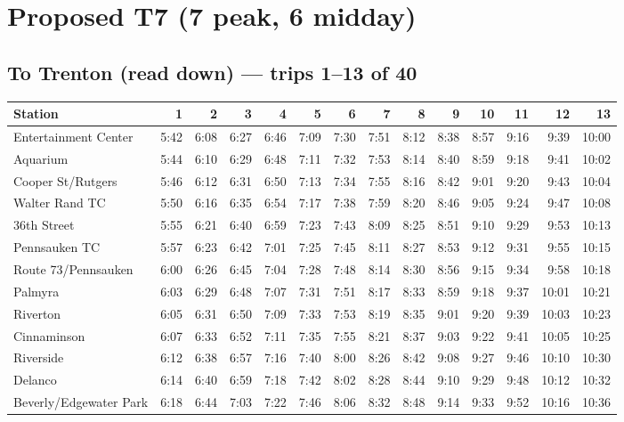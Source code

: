 \section{Proposed T7 (7 peak, 6 midday)}\label{tt:proposed_T7}
\subsection*{To Trenton (read down) --- trips 1--13 of 40}
\begin{center}\footnotesize\setlength{\tabcolsep}{3pt}\begin{tabular}{@{}lrrrrrrrrrrrrr@{}}\toprule
Station & 1 & 2 & 3 & 4 & 5 & 6 & 7 & 8 & 9 & 10 & 11 & 12 & 13 \\\midrule
Entertainment Center & 5:42 & 6:08 & 6:27 & 6:46 & 7:09 & 7:30 & 7:51 & 8:12 & 8:38 & 8:57 & 9:16 & 9:39 & 10:00 \\
Aquarium & 5:44 & 6:10 & 6:29 & 6:48 & 7:11 & 7:32 & 7:53 & 8:14 & 8:40 & 8:59 & 9:18 & 9:41 & 10:02 \\
Cooper St/Rutgers & 5:46 & 6:12 & 6:31 & 6:50 & 7:13 & 7:34 & 7:55 & 8:16 & 8:42 & 9:01 & 9:20 & 9:43 & 10:04 \\
Walter Rand TC & 5:50 & 6:16 & 6:35 & 6:54 & 7:17 & 7:38 & 7:59 & 8:20 & 8:46 & 9:05 & 9:24 & 9:47 & 10:08 \\
36th Street & 5:55 & 6:21 & 6:40 & 6:59 & 7:23 & 7:43 & 8:09 & 8:25 & 8:51 & 9:10 & 9:29 & 9:53 & 10:13 \\
Pennsauken TC & 5:57 & 6:23 & 6:42 & 7:01 & 7:25 & 7:45 & 8:11 & 8:27 & 8:53 & 9:12 & 9:31 & 9:55 & 10:15 \\
Route 73/Pennsauken & 6:00 & 6:26 & 6:45 & 7:04 & 7:28 & 7:48 & 8:14 & 8:30 & 8:56 & 9:15 & 9:34 & 9:58 & 10:18 \\
Palmyra & 6:03 & 6:29 & 6:48 & 7:07 & 7:31 & 7:51 & 8:17 & 8:33 & 8:59 & 9:18 & 9:37 & 10:01 & 10:21 \\
Riverton & 6:05 & 6:31 & 6:50 & 7:09 & 7:33 & 7:53 & 8:19 & 8:35 & 9:01 & 9:20 & 9:39 & 10:03 & 10:23 \\
Cinnaminson & 6:07 & 6:33 & 6:52 & 7:11 & 7:35 & 7:55 & 8:21 & 8:37 & 9:03 & 9:22 & 9:41 & 10:05 & 10:25 \\
Riverside & 6:12 & 6:38 & 6:57 & 7:16 & 7:40 & 8:00 & 8:26 & 8:42 & 9:08 & 9:27 & 9:46 & 10:10 & 10:30 \\
Delanco & 6:14 & 6:40 & 6:59 & 7:18 & 7:42 & 8:02 & 8:28 & 8:44 & 9:10 & 9:29 & 9:48 & 10:12 & 10:32 \\
Beverly/Edgewater Park & 6:18 & 6:44 & 7:03 & 7:22 & 7:46 & 8:06 & 8:32 & 8:48 & 9:14 & 9:33 & 9:52 & 10:16 & 10:36 \\

\end{tabular}
\end{center}
